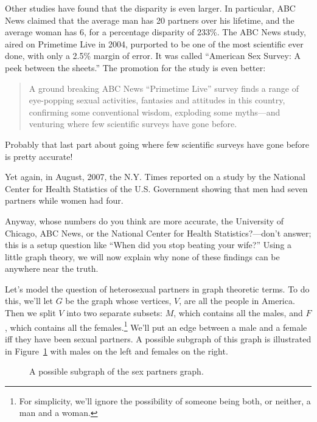 Other studies have found that the disparity is even larger.  In
particular, ABC News claimed that the average man has 20 partners over his
lifetime, and the average woman has 6, for a percentage disparity of
233\%.  The ABC News study, aired on Primetime Live in 2004, purported to
be one of the most scientific ever done, with only a 2.5\% margin of
error.  It was called ``American Sex Survey: A peek between the sheets.''
The promotion for the study is even better:
\begin{quote}
A ground breaking ABC News ``Primetime Live'' survey finds a range of
eye-popping sexual activities, fantasies and attitudes in this country,
confirming some conventional wisdom, exploding some myths---and venturing
where few scientific surveys have gone before.
\end{quote}
Probably that last part about going where few scientific surveys have gone
before is pretty accurate!

Yet again, in August, 2007, the N.Y. Times reported
on a study by the National Center for Health Statistics of the
U.S. Government showing that men had seven partners while women had
four.

Anyway, whose numbers do you think are more accurate, the University
of Chicago, ABC News, or the National Center for Health
Statistics?---don't answer; this is a setup question like ``When did
you stop beating your wife?''  Using a little graph theory, we will
now explain why none of these findings can be anywhere near the truth.

Let's model the question of heterosexual partners in graph theoretic
terms.  To do this, we'll let $G$ be the graph whose vertices, $V$,
are all the people in America.  Then we split $V$ into two separate
subsets: $M$, which contains all the males, and $F$, which contains
all the females.\footnote{For simplicity, we'll ignore the possibility
  of someone being both, or neither, a man and a woman.}  We'll put an
edge between a male and a female iff they have been sexual partners.
A possible subgraph of this graph is illustrated in
Figure~\ref{fig:partners} with males on the left and females on the
right.

\begin{figure}[htbp]


\caption{A possible subgraph of the sex partners graph.}
\label{fig:partners}
\end{figure}

